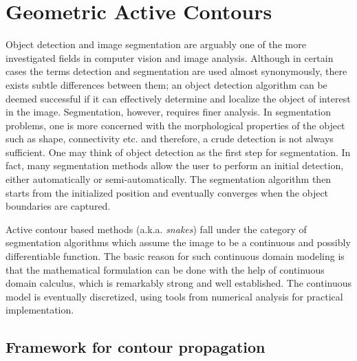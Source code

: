 
\chapter{Geometric Active Contours} %

\label{GAC_chapter} %



Object detection and image segmentation are arguably one of the more investigated fields in computer vision and image analysis. Although in certain cases the terms detection and segmentation are used almost synonymously, there exists subtle differences between them; an object detection algorithm can be deemed successful if it can effectively determine and localize the object of interest in the image. Segmentation, however, requires finer analysis. In segmentation problems, one is more concerned with the morphological properties of the object such as shape, connectivity etc. and therefore, a crude detection is not always sufficient. One may think of object detection as the first step for segmentation. In fact, many segmentation methods allow the user to perform an initial detection, either automatically or semi-automatically. The segmentation algorithm then starts from the initialized position and eventually converges when the object boundaries are captured.

Active contour based methods (a.k.a. \textit{snakes}) fall under the category of segmentation algorithms which assume the image to be a  continuous and possibly differentiable function. The basic reason for such continuous domain modeling is that the mathematical formulation can be done with the help of continuous domain calculus, which is remarkably strong and well established. The continuous model is eventually discretized, using tools from numerical analysis for practical implementation.

\section{Framework for contour propagation}

